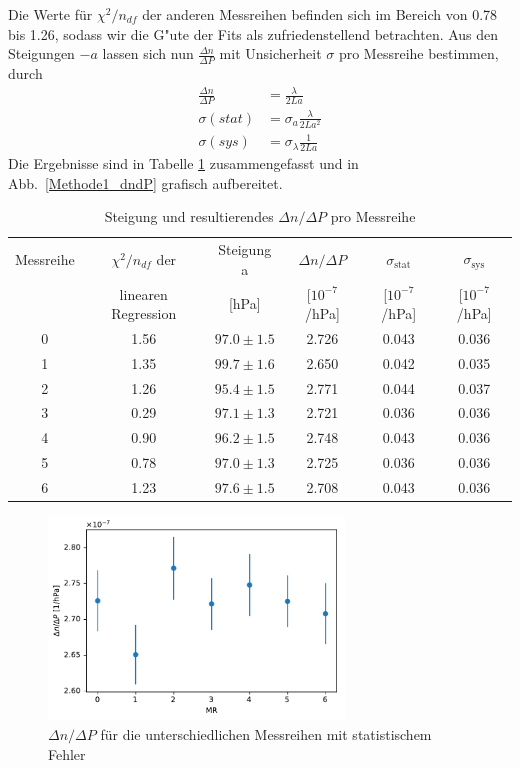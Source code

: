 \documentclass[12pt,a4paper]{article}
\begin{document}
Die Werte für $\chi^2/n_{df}$  der anderen Messreihen befinden sich im Bereich von 0.78 bis 1.26, sodass wir die G"ute der Fits als zufriedenstellend betrachten. Aus den Steigungen $-a$ lassen sich nun $\frac{\Delta n}{\Delta P}$ mit Unsicherheit $\sigma$ pro Messreihe bestimmen, durch
\begin{align}\label{eq:dndp_aus_Steigung}
\frac{\Delta n}{\Delta P}&=\frac{\lambda}{2La}\nonumber\\
\sigma(stat)&=\sigma_{a}\frac{\lambda}{2La^2}\nonumber\\
\sigma(sys)&=\sigma_{\lambda}\frac{1}{2La}
\end{align}
Die Ergebnisse sind in Tabelle \ref{table:Methode1_dndP} zusammengefasst und in Abb.~\eqref{Methode1_dndP} grafisch aufbereitet.
\begin{table}[H]
	\centering
	\begin{tabular}{|c|c|c|c|c|c|}
		\hline
		Messreihe&$\chi^2/n_{df}$ der&Steigung a &$\Delta n/\Delta P$&$\sigma_{\text{stat}}$&$\sigma_{\text{sys}}$\\
		&linearen Regression&[hPa]&[$10^{-7}$/hPa]&[$10^{-7}$/hPa]&[$10^{-7}$/hPa]\\
		\hline
		0&1.56&$97.0\pm1.5$&2.726&0.043&0.036\\
		\hline
		1&1.35&$99.7\pm1.6$&2.650&0.042&0.035\\
		\hline
		2&1.26&$95.4\pm1.5$&2.771&0.044&0.037\\
		\hline
		3&0.29&$97.1\pm1.3$&2.721&0.036&0.036\\
		\hline
		4&0.90&$96.2\pm1.5$&2.748&0.043&0.036\\
		\hline
		5&0.78&$97.0\pm1.3$&2.725&0.036&0.036\\
		\hline
		6&1.23&$97.6\pm1.5$&2.708&0.043&0.036\\
		\hline
	\end{tabular}
	\caption{Steigung und resultierendes $\Delta n/\Delta P$ pro Messreihe}
	\label{table:Methode1_dndP}
\end{table}

\begin{figure}[H]
	\centering
	\includegraphics[width=0.7\textwidth]{Python/Methode1_Ergebnisse.pdf}
	\caption{$\Delta n/\Delta P$ für die unterschiedlichen Messreihen mit statistischem Fehler}
	\label{Methode1_dndP}
\end{figure}
\end{document}
